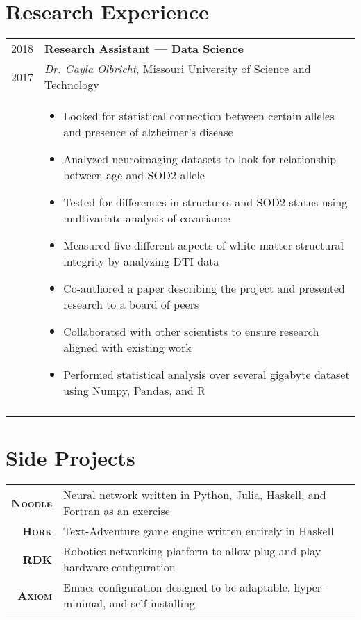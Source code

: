 \documentclass[a4paper,10pt]{article}
\newcommand{\br}{\\\multicolumn{2}{c}{}}
\begin{document}
\section{Research Experience}
\begin{tabular}{r p{15cm}}
    \textsc{2018} & \textbf{Research Assistant --- Data Science} \\
    \textsc{2017} & \textit{Dr. Gayla Olbricht}, Missouri University of Science and Technology \\ &
    \begin{itemize}
    \item Looked for statistical connection between certain alleles and presence of alzheimer's disease
    \item Analyzed neuroimaging datasets to look for relationship between age and SOD2 allele
    \item Tested for differences in structures and SOD2 status using multivariate analysis of covariance
    \item Measured five different aspects of white matter structural integrity by analyzing DTI data
    \item Co-authored a paper describing the project and presented research to a board of peers
    \item Collaborated with other scientists to ensure research aligned with existing work
    \item Performed statistical analysis over several gigabyte dataset using Numpy, Pandas, and R
    \end{itemize} \br\\

\end{tabular}

\section{Side Projects}
\begin{tabular}{r p{15cm}}
  \textsc{\small \textbf {Noodle}} & Neural network written in Python, Julia, Haskell, and Fortran as an exercise\\
  \textsc{\small \textbf {Hork}}   & Text-Adventure game engine written entirely in Haskell \\
  \textsc{\small \textbf {RDK}}    & Robotics networking platform to allow plug-and-play hardware configuration \\
  \textsc{\small \textbf {Axiom}}  & Emacs configuration designed to be adaptable, hyper-minimal, and self-installing \\

\end{tabular}
\end{document}
